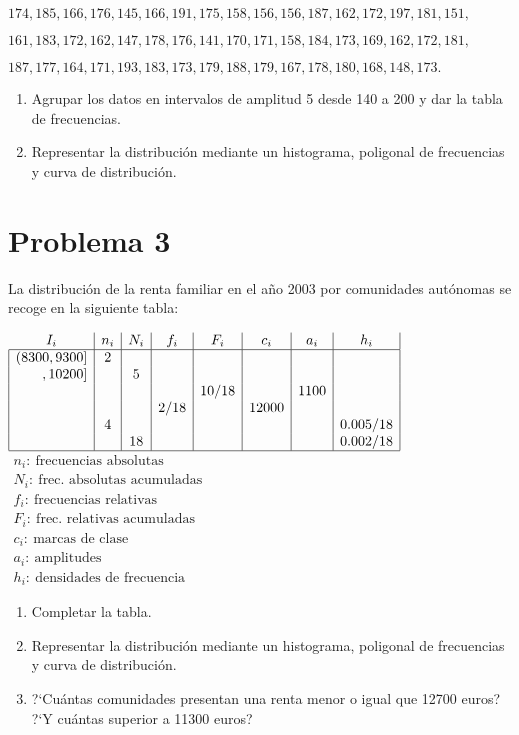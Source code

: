 \documentclass{article}
\begin{document}
	\smallskip
	\centerline{$174,185,166,176,145,166,191,175,158,156,156,187,162,172,197,181,151,$}
	\smallskip
	\centerline{$161,183,172,162,147,178,176,141,170,171,158,184,173,169,162,172,181,$}
	\smallskip
	\centerline{$187,177,164,171,193,183,173,179,188,179,167,178,180,168,148,173.$}
	\vskip -1cm
	\begin{enumerate}
		\item Agrupar los datos en intervalos de amplitud 5 desde 140 a 200 y dar la tabla de frecuencias.
		\item Representar la distribuci{\'o}n mediante un histograma, poligonal de
		frecuencias y curva de distribuci{\'o}n. \\
	\end{enumerate}
	
	\color{black}
	
	
	
	
	\section{Problema 3}
	\color{blue}
	La distribuci{\'o}n de la renta familiar  en el a{\~n}o 2003 por comunidades aut{\'o}nomas se recoge en la
	siguiente tabla:
	
	$\begin{array}{|r|c|c|c|c|c|c|c|}
	\multicolumn{1}{c|}{I_{i}} & n_{i} & N_{i} & f_{i} & F_{i} & c_{i} & a_{i} & h_{i} \\
	\hline
	(8300,9300] & 2 &  &  &  &  &  &  \\
	,10200] &  & 5 &  &  &  &  &  \\
	&  &  &  & 10/18 &  & 1100 &  \\
	&  &  & 2/18 &  & 12000 &  &  \\
	& 4 &  &  &  &  &  & 0\mbox{.}005/18 \\
	&  & 18 &  &  &  &  & 0\mbox{.}002/18 \\  \hline
	\end{array}$ \hskip 1cm $\begin{array}{l}  n_i: \ \mbox{frecuencias absolutas} \\ N_i:  \ \mbox{frec. absolutas acumuladas}\\ f_i:  \ \mbox{frecuencias relativas}
	\\ F_i:  \ \mbox{frec. relativas acumuladas}\\ c_i:  \ \mbox{marcas de clase}\\ a_i:  \ \mbox{amplitudes} \\ h_i:  \ \mbox{densidades de frecuencia}\end{array}$
	\begin{enumerate}
		\item Completar la tabla.
		\item Representar la distribuci{\'o}n mediante un histograma,
		poligonal de frecuencias y curva de distribuci{\'o}n.
		\item ?`Cu{\'a}ntas comunidades presentan una renta menor o igual
		que 12700 euros? ?`Y cu{\'a}ntas superior a 11300 euros? \\
	\end{enumerate}
	
\end{document}
